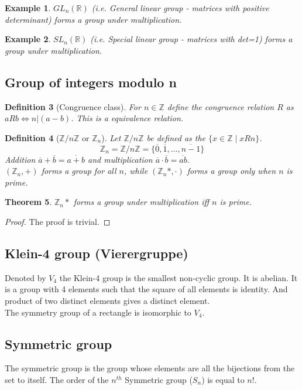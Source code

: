 \documentclass[oneside,11pt,pdftex]{book}%
\numberwithin{equation}{section}
\newtheorem{theorem}{Theorem}[chapter]%
\newtheorem{example}[theorem]{Example}
\newtheorem{definition}[theorem]{Definition}
\numberwithin{section}{chapter}
\numberwithin{equation}{chapter}
\newcommand{\R}{\mathbb{R}}
\newcommand{\Z}{\mathbb{Z}}
\begin{document}
\begin{example}
	$ GL_n(\R) $ (i.e. General linear group - matrices with positive determinant) forms a group under multiplication. 
\end{example}

\begin{example}
	$SL_n(\R)$ (i.e. Special linear group - matrices with det=1) forms a group under multiplication.
\end{example}

\subsection{Group of integers modulo n}
	
\begin{definition}[Congruence class]
	For $ n \in \Z $ define the congruence relation $ R $ as $aRb \iff n | (a-b)$. This is a equivalence relation.
\end{definition}
\begin{definition}[$ \Z/n\Z $ or $ \Z_n $]
	Let $ \Z/ n \Z $ be defined as the $ \{x \in \Z \mid x R n\} $.\\
	\[ \Z_n=\Z/n\Z = \{\overline{0}, \overline{1}, \dots, \overline{n-1} \} \]
	Addition $ \overline{a}+\overline{b}=\overline{a+b} $ and multiplication $ \overline{a}\cdot \overline{b}=\overline{ab} $.\\
	$ (\Z_n,+) $ forms a group for all $ n $, while $ (\Z_n*,\cdot) $ forms a group only when $ n $ is prime.
\end{definition}

\begin{theorem}
	$ \Z_n*  $ forms a group under multiplication iff $ n $ is prime.
\end{theorem}
\begin{proof}
	The proof is trivial.
\end{proof}

\subsection{Klein-4 group (Vierergruppe)}
Denoted by $ V_4 $ the Klein-4 group is the smallest non-cyclic group. It is abelian. It is a group with 4 elements such that the square of all elements is identity. And product of two distinct elements gives a distinct element.\\
The symmetry group of a rectangle is isomorphic to $ V_4 $.

\subsection{Symmetric group}
The symmetric group is the group whose elements are all the bijections from the set to itself. The order of the $ n^{th} $ Symmetric group ($ S_n $) is equal to $ n! $.
\end{document}
